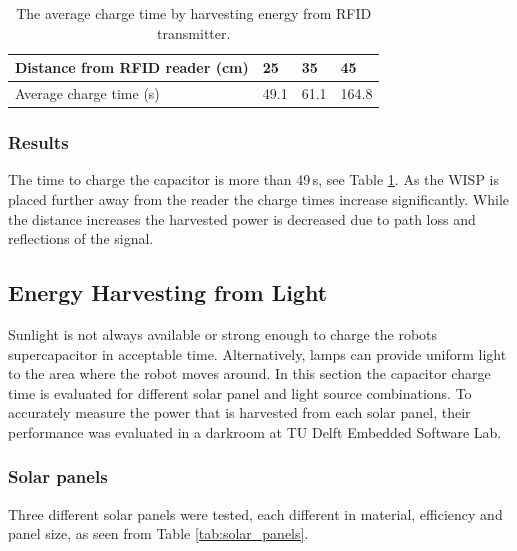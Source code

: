 \begin{table}[t]
	\centering
	\caption{The average charge time by harvesting energy from RFID transmitter.}
	\label{tab:res_rf_harvest}
	\begin{tabular}{|l||l|l|l|}
		\hline
		Distance from RFID reader (cm) & 25 & 35 & 45 \\
		\hline \hline
		Average charge time (s) & 49.1 & 61.1 & 164.8 \\
		\hline
	\end{tabular}
\end{table}

\subsubsection{Results}
The time to charge the capacitor is more than 49\,s, see Table \ref{tab:res_rf_harvest}.
As the WISP is placed further away from the reader the charge times increase significantly.
While the distance increases the harvested power is decreased due to path loss and reflections of the signal.

\subsection{Energy Harvesting from Light}
Sunlight is not always available or strong enough to charge the robots supercapacitor in acceptable time.
Alternatively, lamps can provide uniform light to the area where the robot moves around.
In this section the capacitor charge time is evaluated for different solar panel and light source combinations.
To accurately measure the power that is harvested from each solar panel, their performance was evaluated in a darkroom at TU Delft Embedded Software Lab.

\subsubsection{Solar panels}
Three different solar panels were tested, each different in material, efficiency and panel size, as seen from Table \ref{tab:solar_panels}.

